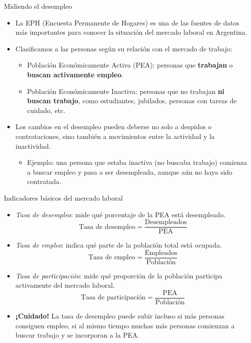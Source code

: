 \documentclass{beamer}
\begin{document}
\begin{frame}{Midiendo el desempleo}
    \begin{itemize}
        \item La EPH (Encuesta Permanente de Hogares) es una de las fuentes de datos más importantes para conocer la situación del mercado laboral en Argentina.
        
        \item Clasificamos a las personas según su relación con el mercado de trabajo:
        \begin{itemize}
            \item Población Económicamente Activa (PEA): personas que \textbf{trabajan} o \textbf{buscan activamente empleo}.
            \item Población Económicamente Inactiva: personas que no trabajan \textbf{ni buscan trabajo}, como estudiantes, jubilados, personas con tareas de cuidado, etc.
        \end{itemize}
        
        \item Los cambios en el desempleo pueden deberse no solo a despidos o contrataciones, sino también a movimientos entre la actividad y la inactividad.
        \begin{itemize}
            \item Ejemplo: una persona que estaba inactiva (no buscaba trabajo) comienza a buscar empleo y pasa a ser desempleada, aunque aún no haya sido contratada.
        \end{itemize}
    \end{itemize}
\end{frame}

\begin{frame}{Indicadores básicos del mercado laboral}
    \small
    \begin{itemize}
        \item \textit{Tasa de desempleo}: mide qué porcentaje de la PEA está desempleado.
        \[
        \text{Tasa de desempleo} = \frac{\text{Desempleados}}{\text{PEA}}
        \]
        
        \item \textit{Tasa de empleo}: indica qué parte de la población total está ocupada.
        \[
        \text{Tasa de empleo} = \frac{\text{Empleados}}{\text{Población}}
        \]
        
        \item \textit{Tasa de participación}: mide qué proporción de la población participa activamente del mercado laboral.
        \[
        \text{Tasa de participación} = \frac{\text{PEA}}{\text{Población}}
        \]
        
        \item \textbf{¡Cuidado!} La tasa de desempleo puede subir incluso si más personas consiguen empleo, si al mismo tiempo muchas más personas comienzan a buscar trabajo y se incorporan a la PEA.
    \end{itemize}

\end{frame}
\end{document}
